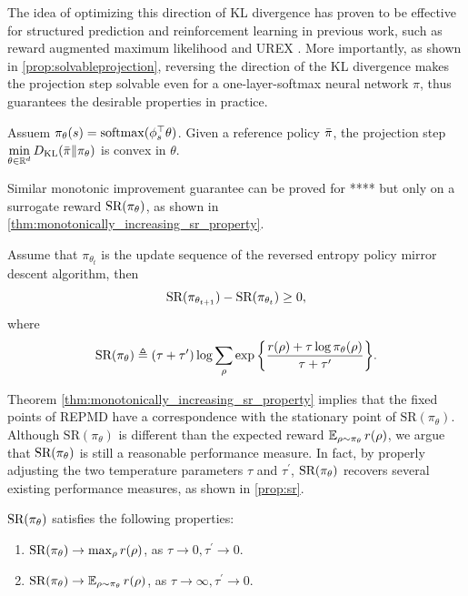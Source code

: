 \documentclass{article} %
\begin{document}
The idea of optimizing this direction of KL divergence has proven to be effective for structured prediction and reinforcement learning in previous work, such as reward augmented maximum likelihood \citep{norouzi2016reward} and UREX \citep{nachum2017improving}.
More importantly, as shown in \cref{prop:solvableprojection}, reversing the direction of the KL divergence makes the projection step solvable even for a one-layer-softmax neural network $\pi$, thus guarantees the desirable properties in practice.
\begin{prop}
	
	Assuem $\pi_\theta(s) = \mathrm{softmax}(\phi_s^{\top}\theta)$. Given a reference policy $\bar{\pi}$, the projection step $\min\limits_{\theta \in \mathbb{R}^d}{D_{\mathrm{KL}}(\bar{\pi} \| \pi_\theta)}$ is convex in $\theta$.
\end{prop}
\label{prop:solvableprojection}
Similar monotonic improvement guarantee can be proved for **** but only on a surrogate reward $\text{SR}(\pi_\theta) $, as shown in \cref{thm:monotonically_increasing_sr_property}.
\begin{thm}
\label{thm:monotonically_increasing_sr_property}
Assume that $\pi_{\theta_{t}}$ is the update sequence of the reversed entropy policy mirror descent algorithm, then
\begin{equation*}
	\text{SR}(\pi_{\theta_{t+1}}) - \text{SR}(\pi_{\theta_t})\ge 0,
\end{equation*}
where
\begin{equation}
\label{eq:SR}
\text{SR}(\pi_\theta) \triangleq (\tau + \tau^{\prime})\log{ \sum_{\rho}{ \exp\left\{ \frac{r(\rho) + \tau \log{\pi_\theta(\rho)} }{\tau + \tau^{\prime}} \right\} }}.
\end{equation}
\end{thm}
Theorem \ref{thm:monotonically_increasing_sr_property} implies that the fixed points of REPMD have a correspondence with the stationary point of $\text{SR}(\pi_\theta)$. 
Although $\text{SR}(\pi_\theta)$ is different than the expected reward $\operatorname*{\mathbb{E}}_{\rho \sim \pi_\theta}{r(\rho)}$,  we argue that $\text{SR}(\pi_\theta)$ is still a reasonable performance measure. In fact, by properly adjusting the two temperature parameters $\tau$ and $\tau^{\prime}$, $\text{SR}(\pi_\theta)$ recovers several existing performance measures, as shown in \cref{prop:sr}.
\begin{prop}
\label{prop:sr}
$\text{SR}(\pi_\theta)$ satisfies the following properties:
\begin{enumerate}[label=(\roman*)]
	\item  $\text{SR}(\pi_\theta) \to \max_{\rho}{r(\rho)}$, as $\tau \to 0, \tau^{\prime} \to 0$.
	\item $\text{SR}(\pi_\theta) \to \operatorname*{\mathbb{E}}_{\rho \sim \pi_\theta}{r(\rho)}$, as $\tau \to \infty, \tau^{\prime} \to 0$. 
\end{enumerate}	
\end{prop}
\end{document}
